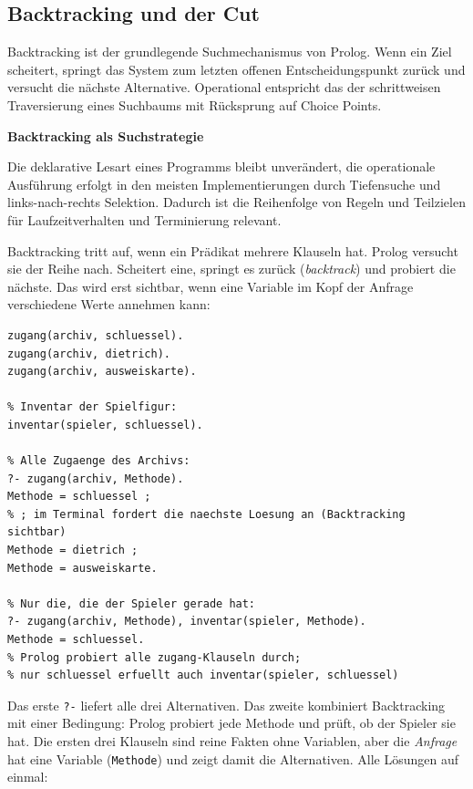\documentclass[parskip=half,a4paper,11pt]{scrreprt}
\begin{document}
\subsection{Backtracking und der Cut}
Backtracking ist der grundlegende Suchmechanismus von Prolog. Wenn ein Ziel scheitert, springt das System zum letzten offenen Entscheidungspunkt zurück und versucht die nächste Alternative. Operational entspricht das der schrittweisen Traversierung eines Suchbaums mit Rücksprung auf Choice Points.

\textbf{Backtracking als Suchstrategie}

Die deklarative Lesart eines Programms bleibt unverändert, die operationale Ausführung erfolgt in den meisten Implementierungen durch Tiefensuche und links-nach-rechts Selektion. Dadurch ist die Reihenfolge von Regeln und Teilzielen für Laufzeitverhalten und Terminierung relevant.

Backtracking tritt auf, wenn ein Prädikat mehrere Klauseln hat. Prolog versucht sie der Reihe nach. Scheitert eine, springt es zurück (\textit{backtrack}) und probiert die nächste. Das wird erst sichtbar, wenn eine Variable im Kopf der Anfrage verschiedene Werte annehmen kann:

\begin{lstlisting}[caption={}]
% Welche Methoden gibt es, das Archiv zu betreten?
zugang(archiv, schluessel).
zugang(archiv, dietrich).
zugang(archiv, ausweiskarte).

% Inventar der Spielfigur:
inventar(spieler, schluessel).

% Alle Zugaenge des Archivs:
?- zugang(archiv, Methode).
Methode = schluessel ;
% ; im Terminal fordert die naechste Loesung an (Backtracking sichtbar)
Methode = dietrich ;
Methode = ausweiskarte.

% Nur die, die der Spieler gerade hat:
?- zugang(archiv, Methode), inventar(spieler, Methode).
Methode = schluessel.
% Prolog probiert alle zugang-Klauseln durch;
% nur schluessel erfuellt auch inventar(spieler, schluessel)
\end{lstlisting}

Das erste \texttt{?-} liefert alle drei Alternativen. Das zweite kombiniert Backtracking mit einer Bedingung: Prolog probiert jede Methode und prüft, ob der Spieler sie hat. Die ersten drei Klauseln sind reine Fakten ohne Variablen, aber die \emph{Anfrage} hat eine Variable (\texttt{Methode}) und zeigt damit die Alternativen. Alle Lösungen auf einmal:
\end{document}
